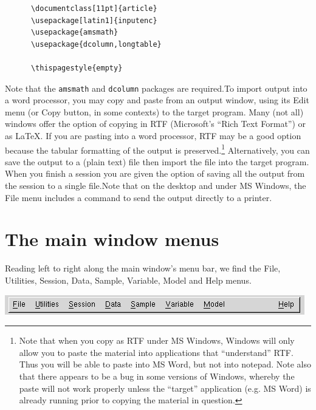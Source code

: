 \begin{verbatim}
      \documentclass[11pt]{article}
      \usepackage[latin1]{inputenc}
      \usepackage{amsmath}
      \usepackage{dcolumn,longtable}
      
      \thispagestyle{empty}\end{verbatim} 

Note that the \verb+amsmath+
 and \verb+dcolumn+ packages are required.To import  output
 into a word processor, you may copy and paste from an output window,
 using its \textsf{Edit} menu (or Copy button, in some contexts) to
 the target program.  Many (not all)  windows offer the
 option of copying in RTF (Microsoft's ``Rich Text Format'') or as
 {\LaTeX}. If you are pasting into a word processor, RTF may be a good
 option because the tabular formatting of the output is
 preserved.\footnote{Note that when you copy as RTF under MS Windows,
 Windows will only allow you to paste the material into applications
 that ``understand'' RTF.  Thus you will be able to paste into MS
 Word, but not into notepad.  Note also that there appears to be a bug
 in some versions of Windows, whereby the paste will not work properly
 unless the ``target'' application (e.g.  MS Word) is already running
 prior to copying the material in question.}  Alternatively, you can
 save the output to a (plain text) file then import the file into the
 target program.  When you finish a  session you are given
 the option of saving all the output from the session to a single
 file.Note that on the  desktop and under MS Windows, the
 \textsf{File} menu includes a command to send the output directly to
 a printer.

\section{The main window menus}
\label{menus}


      Reading left to right along the main window's menu bar, we find
      the File, Utilities, Session, Data, Sample, Variable, Model and
      Help menus.
    \begin{center}
      \includegraphics[scale=0.5]{figures/menubar}
    \end{center}

